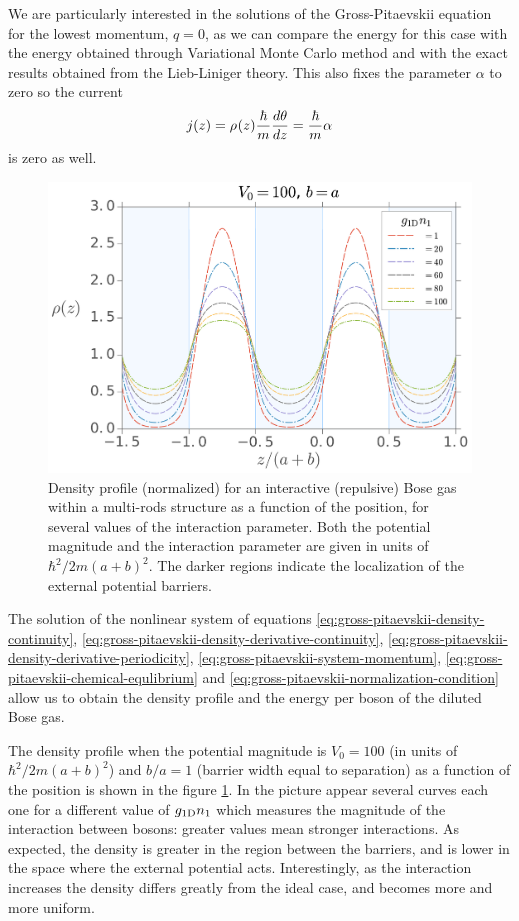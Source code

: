 We are particularly interested in the solutions of the Gross-Pitaevskii equation for the lowest momentum, $q = 0$,
as we can compare the energy for this case with the energy obtained through Variational Monte Carlo method and with
the exact results obtained from the Lieb-Liniger theory. This also fixes the parameter $\alpha$ to zero so
the
current
%
\begin{equation}
	j(z) = {\rho_{}}(z) \frac{\hbar}{m} \frac{d\theta}{dz} = \frac{\hbar}{m} \alpha
\end{equation}
%
is zero as well.
%
\begin{figure}[t!]
	\centering
	\includegraphics[width=0.75\linewidth]{./figures/density_profile_gp_u0-100_r-1}
	\caption{
		Density profile (normalized) for an interactive (repulsive) Bose gas within a multi-rods structure as
		a function of the position, for several values of the interaction parameter. Both the potential magnitude and
		the interaction parameter are given in units of $\hbar^2 / 2 m (a+b)^2$. The darker regions indicate the
		localization of the external potential barriers.
	}
	\label{fig:density-profile-gp-u0-100-r-1}
\end{figure}
%
The solution of the nonlinear system of equations \eqref{eq:gross-pitaevskii-density-continuity}, \eqref{eq:gross-pitaevskii-density-derivative-continuity}, \eqref{eq:gross-pitaevskii-density-derivative-periodicity}, \eqref{eq:gross-pitaevskii-system-momentum},
\eqref{eq:gross-pitaevskii-chemical-equlibrium} and \eqref{eq:gross-pitaevskii-normalization-condition} allow us to obtain the density profile and
the energy per boson of the diluted Bose gas.

The density profile when the potential magnitude is $V_0 = 100$ (in units of $\hbar^2 / 2m(a+b)^2$) and $b/a = 1$ (barrier width equal to separation) as a function of the
position is shown in the figure \ref{fig:density-profile-gp-u0-100-r-1}. In the picture appear several curves each one
for a different value of $g_{ \mathrm{1D} } n_1$ which measures the magnitude of the interaction between bosons: greater values
mean stronger interactions. As expected, the density is greater in the region between the barriers, and is lower in the
space where the external potential acts. Interestingly, as the interaction increases the density differs greatly from
the ideal case, and becomes more and more uniform.


